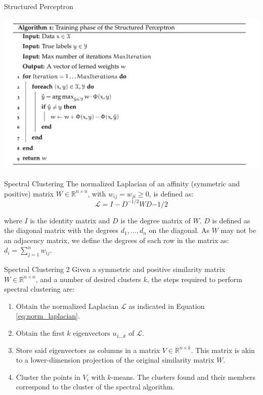 \documentclass[10pt,=table]{beamer}
\begin{document}
\begin{frame}{Structured Perceptron}
\begin{center}
\includegraphics[width=\linewidth]{image2/Appendix/structured_perceptron}
\end{center}
\end{frame}
\begin{frame}{Spectral Clustering}
The normalized Laplacian of an affinity (symmetric and positive) matrix $W\in \mathbb{R}^{n\times n}$, with $w_{ij} = w_{ji} \geq 0$, is defined as: 
\begin{equation}\label{eq:norm_laplacian}
\mathcal{L} = I - D^{-1/2}WD{-1/2}
\end{equation}

where $I$ is the identity matrix and $D$ is the degree matrix of $W$. $D$ is defined as the diagonal matrix with the degrees $d_1 ,\dots,d_n$ on the diagonal. As $W$ may not be an adjacency matrix, we define the degrees of each row in the matrix as: $d_i=\sum_{j=1}^{n}{w_{ij}}$.
\end{frame}
\begin{frame}{Spectral Clustering 2}
Given a  symmetric and positive similarity matrix $W \in \mathbb{R}^{n \times n}$, and a number of desired clusters $k$, the steps required to perform spectral clustering are:

\begin{enumerate}
\item Obtain the normalized Laplacian $\mathcal{L}$ as indicated in Equation \ref{eq:norm_laplacian}.
\item Obtain the first $k$ eigenvectors $u_{1\dots k}$ of $\mathcal{L}$.
\item Store said eigenvectors as columns in a matrix $V \in \mathbb{R}^{n \times k}$. This matrix is akin to a lower-dimension projection of the original similarity matrix $W$.
\item Cluster the points in $V_i$ with $k$-means. The clusters found and their members correspond to the cluster of the spectral algorithm.
\end{enumerate}

\end{frame}
\end{document}
